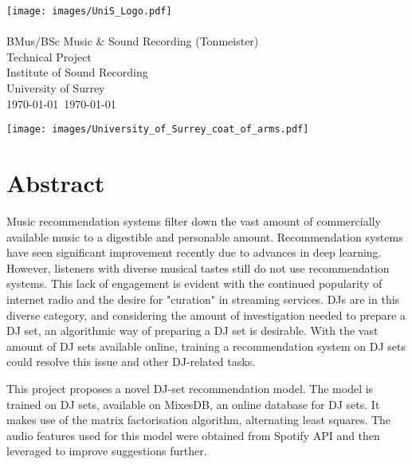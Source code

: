 
\graphicspath{{FrontMatter/}}

\begin{titlepage}
\thispagestyle{empty}
\hfill\texttt{[image: images/UniS\_Logo.pdf]}
{\sf
\centering
\null\vfil\vfil
	{
		\huge\LongTitle\\
	}
\vfil\vfil\vfil
	{
		\Large\Me\\
	}
\vfil\vfil\vfil
	{
		\Large{}BMus/BSc Music \& Sound Recording (Tonmeister)\\
		Technical Project\\
	}
\vfil\vfil
	{
		\Large{}Institute of Sound Recording\\
		University of Surrey\\
	}
\vfil
	{
		\Large\MyMonth\today~\MyYear\today\\}
	}

	{
		\texttt{[image: images/University\_of\_Surrey\_coat\_of\_arms.pdf]}
		\vspace{-.4in}
	}
\end{titlepage}

\setlength{\parskip}{1ex plus 0.2ex minus 0.2ex} %
\onehalfspacing



\chapter*{Abstract}
\thispagestyle{empty}
\setcounter{page}{2}

Music recommendation systems filter down the vast amount of commercially available music to a digestible and personable amount. Recommendation systems have seen significant improvement recently due to advances in deep learning. However, listeners with diverse musical tastes still do not use recommendation systems. This lack of engagement is evident with the continued popularity of internet radio and the desire for "curation" in streaming services. DJs are in this diverse category, and considering the amount of investigation needed to prepare a DJ set, an algorithmic way of preparing a DJ set is desirable. With the vast amount of DJ sets available online, training a recommendation system on DJ sets could resolve this issue and other DJ-related tasks.

This project proposes a novel DJ-set recommendation model. The model is trained on DJ sets, available on MixesDB, an online database for DJ sets. It makes use of the matrix factorisation algorithm, alternating least squares. The audio features used for this model were obtained from Spotify API and then leveraged to improve suggestions further.

